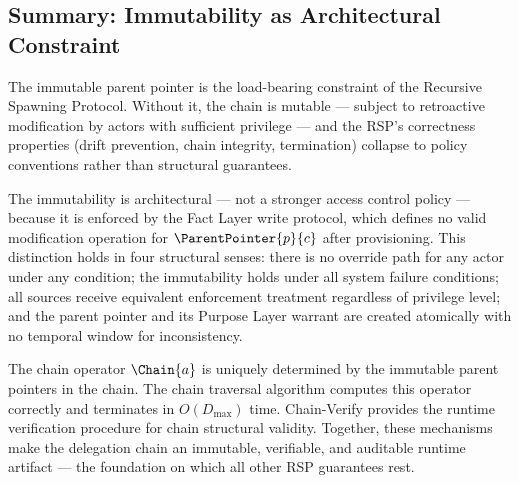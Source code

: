 \subsection{Summary: Immutability as Architectural Constraint}
\label{sec:immutability-summary}

The immutable parent pointer is the load-bearing constraint of the Recursive Spawning Protocol. Without it, the chain is mutable — subject to retroactive modification by actors with sufficient privilege — and the RSP's correctness properties (drift prevention, chain integrity, termination) collapse to policy conventions rather than structural guarantees.

The immutability is architectural — not a stronger access control policy — because it is enforced by the Fact Layer write protocol, which defines no valid modification operation for $\ParentPointer{p}{c}$ after provisioning. This distinction holds in four structural senses: there is no override path for any actor under any condition; the immutability holds under all system failure conditions; all sources receive equivalent enforcement treatment regardless of privilege level; and the parent pointer and its Purpose Layer warrant are created atomically with no temporal window for inconsistency.

The chain operator $\Chain{a}$ is uniquely determined by the immutable parent pointers in the chain. The chain traversal algorithm computes this operator correctly and terminates in $O(D_{\max})$ time. Chain-Verify provides the runtime verification procedure for chain structural validity. Together, these mechanisms make the delegation chain an immutable, verifiable, and auditable runtime artifact — the foundation on which all other RSP guarantees rest.